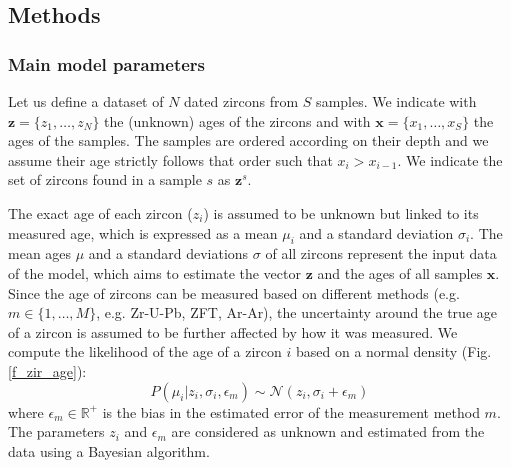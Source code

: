 \documentclass[12pt,letterpaper]{article}
\begin{document}
\begin{flushright}
\end{flushright}
\bigskip
\noindent 

\bigskip
\medskip
\begin{center}


\iftrue
\bigskip
{}
\fi
\end{center}

\vspace{1.5in}
\linenumbers
\subsection{Methods}
\subsubsection{Main model parameters}
Let us define a dataset of $N$ dated zircons from $S$ samples. We indicate with $\mathbf{z} = \{z_1, \dots, z_N\}$ the (unknown) ages of the zircons and with $\mathbf{x} = \{x_1, \dots, x_S\}$ the ages of the samples.
The samples are ordered according on their depth and we assume their age strictly follows that order such that $x_{i} > x_{i - 1}$. 
We indicate the set of zircons found in a sample $s$ as $\mathbf{z}^s$.

The exact age of each zircon ($z_i$) is assumed to be unknown but linked to its measured age, which is expressed as a mean $\mu_i$ and a standard deviation $\sigma_i$.
The mean ages $\mu$ and a standard deviations $\sigma$ of all zircons represent the input data of the model, which aims to estimate the vector $\mathbf{z}$ and the ages of all samples $\mathbf{x}$. 
Since the age of zircons can be measured based on different methods (e.g. $m \in \{1, \dots, M \}$, e.g. Zr-U-Pb, ZFT, Ar-Ar), the uncertainty around the true age of a zircon is assumed to be further affected by how it was measured. We compute the likelihood of the age of a zircon $i$ based on a normal density (Fig. \ref{f_zir_age}):
\begin{equation}
P(\mu_i | z_i, \sigma_i, \epsilon_m) \sim \mathcal{N}(z_i, \sigma_i + \epsilon_m)   
\end{equation}
where 
 $\epsilon_m \in \mathbb{R^+}$ is the bias in the estimated error of the measurement method $m$.
The parameters  $z_i$ and $\epsilon_m$ are considered as unknown and estimated from the data using a Bayesian algorithm.
\end{document}
